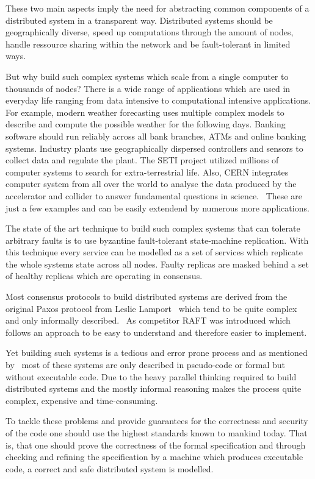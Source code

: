 These two main aspects imply the need for abstracting common components
of a distributed system in a transparent way. Distributed systems should be
geographically diverse, speed up computations through the amount of nodes,
handle ressource sharing within the network and be fault-tolerant in limited
ways.

But why build such complex systems which scale from a single computer
to thousands of nodes? There is a wide range of applications which are used in
everyday life ranging from data intensive to computational intensive
applications. For example, modern weather forecasting uses multiple complex
models to describe and compute the possible weather for the following days.
Banking software should run reliably across all bank branches, ATMs and
online banking systems. Industry plants use geographically dispersed
controllers and sensors to collect data and regulate the plant.
The SETI project utilized millions of computer systems to search for
extra-terrestrial life. Also, CERN integrates computer system from
all over the world to analyse the data produced by the accelerator and
collider to answer fundamental questions in science.~\cite{ghosh2014distributed}
These are just a few examples and can be easily extendend by numerous
more applications.

The state of the art technique to build such complex systems that can
tolerate arbitrary faults is to use byzantine fault-tolerant state-machine
replication. With this technique every service can be modelled as a
set of services which replicate the whole systems state across all
nodes. Faulty replicas are masked behind a set of healthy replicas
which are operating in consensus.~\cite{rahli2018velisarios}

Most consensus protocols to build distributed systems are derived from
the original Paxos protocol from Leslie Lamport~\cite{lamport2001paxos}
which tend to be quite complex and only informally
described.~\cite{ongaro2014search}
As competitor RAFT was introduced which follows an approach to be
easy to understand and therefore easier to implement.

Yet building such systems is a tedious and error prone process and
as mentioned by~\cite{dragoi2015need} most of these systems are only
described in pseudo-code or formal but without executable code.
Due to the heavy parallel thinking required to build distributed
systems and the mostly informal reasoning makes the process quite
complex, expensive and time-consuming.

To tackle these problems and provide guarantees for the correctness and
security of the code one should use the highest standards known to mankind
today. That is, that one should prove the correctness of the formal specification and
through checking and refining the specification by a machine which produces
executable code, a correct and safe distributed system is modelled.~\cite{rahli2018velisarios}

